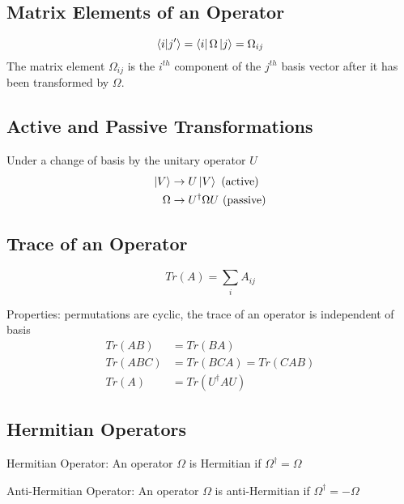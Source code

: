 \subsection{Matrix Elements of an Operator}
\begin{equation}
	\braket{i}{j'} = \bra{i}\Omega\ket{j} = \Omega_{ij}
\end{equation}
The matrix element $\Omega_{ij}$ is the $i^{th}$ component of the $j^{th}$ basis vector after it has been transformed by $\Omega$.

\subsection{Active and Passive Transformations}
Under a change of basis by the unitary operator $U$
\begin{align}
	\ket{V} &\rightarrow U\ket{V} \text{  (active)}\\
	\Omega  &\rightarrow U^{\dagger} \Omega U \text{  (passive)}
\end{align}

\subsection{Trace of an Operator}

\begin{equation}
	Tr (A) = \sum_i A_{ij}
\end{equation}

Properties: permutations are cyclic, the trace of an operator is independent of basis
\begin{align}
	Tr(AB) &= Tr(BA) \\
	Tr(ABC) &= Tr(BCA) = Tr(CAB) \\
	Tr(A) &= Tr(U^\dagger A U)
\end{align}

\subsection{Hermitian Operators}

\begin{definition}{Hermitian Operator:}
	An operator $\Omega$ is Hermitian if $\Omega^\dagger = \Omega$
\end{definition}

\begin{definition}{Anti-Hermitian Operator:}
	An operator $\Omega$ is anti-Hermitian if $\Omega^\dagger=-\Omega$
\end{definition}

